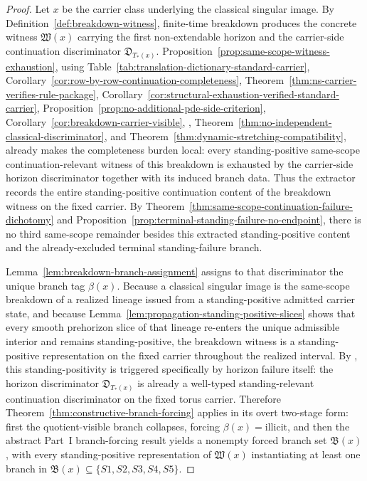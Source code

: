 \begin{proof}
Let $x$ be the carrier class underlying the classical singular image. By Definition~\ref{def:breakdown-witness}, finite-time breakdown produces the concrete witness $\mathfrak W(x)$ carrying the first non-extendable horizon and the carrier-side continuation discriminator $\mathfrak D_{T_*(x)}$. Proposition~\ref{prop:same-scope-witness-exhaustion}, using Table~\ref{tab:translation-dictionary-standard-carrier}, Corollary~\ref{cor:row-by-row-continuation-completeness}, Theorem~\ref{thm:ns-carrier-verifies-rule-package}, Corollary~\ref{cor:structural-exhaustion-verified-standard-carrier}, Proposition~\ref{prop:no-additional-pde-side-criterion}, Corollary~\ref{cor:breakdown-carrier-visible}, \HorizonDetectabilityRef{}, Theorem~\ref{thm:no-independent-classical-discriminator}, and Theorem~\ref{thm:dynamic-stretching-compatibility}, already makes the completeness burden local: every standing-positive same-scope continuation-relevant witness of this breakdown is exhausted by the carrier-side horizon discriminator together with its induced branch data. Thus the extractor records the entire standing-positive continuation content of the breakdown witness on the fixed carrier. By Theorem~\ref{thm:same-scope-continuation-failure-dichotomy} and Proposition~\ref{prop:terminal-standing-failure-no-endpoint}, there is no third same-scope remainder besides this extracted standing-positive content and the already-excluded terminal standing-failure branch.

Lemma~\ref{lem:breakdown-branch-assignment} assigns to that discriminator the unique branch tag $\beta(x)$. Because a classical singular image is the same-scope breakdown of a realized lineage issued from a standing-positive admitted carrier state, and because Lemma~\ref{lem:propagation-standing-positive-slices} shows that every smooth prehorizon slice of that lineage re-enters the unique admissible interior and remains standing-positive, the breakdown witness is a standing-positive representation on the fixed carrier throughout the realized interval. By \HorizonDetectabilityRef{}, this standing-positivity is triggered specifically by horizon failure itself: the horizon discriminator $\mathfrak D_{T_*(x)}$ is already a well-typed standing-relevant continuation discriminator on the fixed torus carrier. Therefore Theorem~\ref{thm:constructive-branch-forcing} applies in its overt two-stage form: first the quotient-visible branch collapses, forcing $\beta(x)=\mathrm{illicit}$, and then the abstract Part~I branch-forcing result yields a nonempty forced branch set $\mathfrak B(x)$, with every standing-positive representation of $\mathfrak W(x)$ instantiating at least one branch in $\mathfrak B(x)\subseteq\{S1,S2,S3,S4,S5\}$.


\end{proof}
